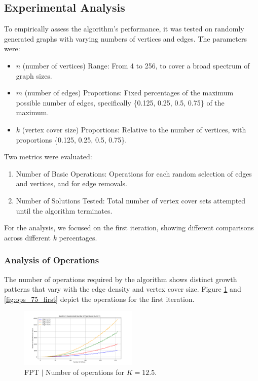 \subsection{Experimental Analysis}
To empirically assess the algorithm's performance, it was tested on randomly generated graphs with varying numbers of vertices and edges. The parameters were:

\begin{itemize}
    \item \(n\) (number of vertices) Range: From 4 to 256, to cover a broad spectrum of graph sizes.
    \item \(m\) (number of edges) Proportions: Fixed percentages of the maximum possible number of edges, specifically \{0.125, 0.25, 0.5, 0.75\} of the maximum.
    \item \(k\) (vertex cover size) Proportions: Relative to the number of vertices, with proportions \{0.125, 0.25, 0.5, 0.75\}.
\end{itemize}

Two metrics were evaluated:\begin{enumerate}
    \item Number of Basic Operations: Operations for each random selection of edges and vertices, and for edge removals.
    \item Number of Solutions Tested: Total number of vertex cover sets attempted until the algorithm terminates.
\end{enumerate}

For the analysis, we focused on the first iteration, showing different comparisons across different \(k\) percentages.

\subsubsection{Analysis of Operations}

The number of operations required by the algorithm shows distinct growth patterns that vary with the edge density and vertex cover size. Figure \ref{fig:ops_12_5_first} and \ref{fig:ops_75_first} depict the operations for the first iteration.

\begin{figure}[h]
\centering
\includegraphics[width=0.5\textwidth]{FPT/Number of Operations (K=12.5).png}
\caption{FPT \(|\) Number of operations for \( K=12.5 \).}
\label{fig:ops_12_5_first}
\end{figure}


